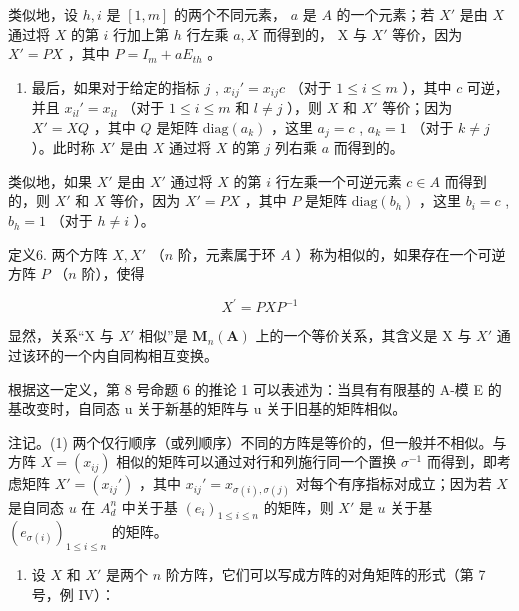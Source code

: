 类似地，设 \(h, i\) 是 \([1, m]\) 的两个不同元素， \(a\) 是 \(A\) 的一个元素；若 \(X'\) 是由 \(X\) 通过将 \(X\) 的第 \(i\) 行加上第 \(h\) 行左乘 \(a, X\) 而得到的， X 与 \(X'\) 等价，因为 \(X' = PX\) ，其中 \(P = I_m + aE_{th}\) 。

\begin{enumerate}
\def\labelenumi{(\arabic{enumi})}
\setcounter{enumi}{2}
\tightlist
\item
  最后，如果对于给定的指标 \(j\) , \(x_{ij}' = x_{ij}c\) （对于 \(1 \leqslant i \leqslant m\) ），其中 \(c\) 可逆，并且 \(x_{il}' = x_{il}\) （对于 \(1 \leqslant i \leqslant m\) 和 \(l \neq j\) ），则 \(X\) 和 \(X'\) 等价；因为 \(X' = XQ\) ，其中 \(Q\) 是矩阵 \(\text{diag}(a_k)\) ，这里 \(a_j = c\) , \(a_k = 1\) （对于 \(k \neq j\) ）。此时称 \(X'\) 是由 \(X\) 通过将 \(X\) 的第 \(j\) 列右乘 \(a\) 而得到的。
\end{enumerate}

类似地，如果 \(X'\) 是由 \(X'\) 通过将 \(X\) 的第 \(i\) 行左乘一个可逆元素 \(c \in A\) 而得到的，则 \(X'\) 和 \(X\) 等价，因为 \(X' = PX\) ，其中 \(P\) 是矩阵 \(\text{diag}(b_h)\) ，这里 \(b_i = c\) , \(b_h = 1\) （对于 \(h \neq i\) ）。

定义6. 两个方阵 \(X, X'\) （\(n\) 阶，元素属于环 \(A\) ）称为相似的，如果存在一个可逆方阵 \(P\) （\(n\) 阶），使得

\[
X ^ {\prime} = P X P ^ {- 1}\tag{41}
\]

显然，关系“X 与 \(X'\) 相似”是 \(\mathbf{M}_{n}(\mathbf{A})\) 上的一个等价关系，其含义是 X 与 \(X'\) 通过该环的一个内自同构相互变换。

根据这一定义，第 8 号命题 6 的推论 1 可以表述为：当具有有限基的 A-模 E 的基改变时，自同态 u 关于新基的矩阵与 u 关于旧基的矩阵相似。

注记。(1) 两个仅行顺序（或列顺序）不同的方阵是等价的，但一般并不相似。与方阵 \(X = (x_{ij})\) 相似的矩阵可以通过对行和列施行同一个置换 \(\sigma^{-1}\) 而得到，即考虑矩阵 \(X' = (x_{ij}')\) ，其中 \(x_{ij}' = x_{\sigma(i),\sigma(j)}\) 对每个有序指标对成立；因为若 \(X\) 是自同态 \(u\) 在 \(A_d^n\) 中关于基 \((e_i)_{1 \leq i \leq n}\) 的矩阵，则 \(X'\) 是 \(u\) 关于基 \((e_{\sigma(i)})_{1 \leq i \leq n}\) 的矩阵。

\begin{enumerate}
\def\labelenumi{(\arabic{enumi})}
\setcounter{enumi}{1}
\tightlist
\item
  设 \(X\) 和 \(X'\) 是两个 \(n\) 阶方阵，它们可以写成方阵的对角矩阵的形式（第 7 号，例 IV）：
\end{enumerate}

